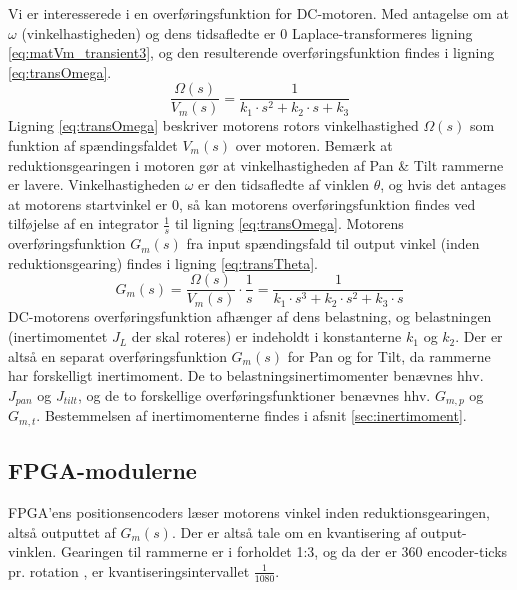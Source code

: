 Vi er interesserede i en overføringsfunktion for DC-motoren. Med antagelse om at \(\omega\) (vinkelhastigheden) og dens tidsafledte er 0
Laplace-transformeres ligning \ref{eq:matVm_transient3}, og den resulterende overføringsfunktion findes
i ligning \ref{eq:transOmega}.
\begin{equation}
	\frac{\Omega\left(s\right)}{V_m\left(s\right)}=\frac{1}{k_1\cdot{}s^2+k_2\cdot{}s+k_3}
	\label{eq:transOmega}
 \end{equation}
Ligning \ref{eq:transOmega} beskriver motorens rotors vinkelhastighed \(\Omega\left(s\right)\) som funktion af spændingsfaldet
\(V_m\left(s\right)\) over motoren. Bemærk at reduktionsgearingen i motoren gør at vinkelhastigheden af Pan \& Tilt rammerne
er lavere.
Vinkelhastigheden \(\omega\) er den tidsafledte af vinklen \(\theta\),
og hvis det antages at motorens startvinkel er 0, så kan motorens overføringsfunktion
findes ved tilføjelse af en integrator \(\frac{1}{s}\) til ligning \ref{eq:transOmega}.
Motorens overføringsfunktion \(G_m\left(s\right)\) fra input spændingsfald til output vinkel (inden reduktionsgearing) findes
i ligning \ref{eq:transTheta}.
\begin{equation}
	G_m\left(s\right)=\frac{\Omega\left(s\right)}{V_m\left(s\right)}\cdot{}\frac{1}{s}=\frac{1}{k_1\cdot{}s^3+k_2\cdot{}s^2+k_3\cdot{}s}
	\label{eq:transTheta}
\end{equation}
DC-motorens overføringsfunktion afhænger af dens belastning,
og belastningen (inertimomentet \(J_L\) der skal roteres) er indeholdt i konstanterne \(k_1\) og \(k_2\).
Der er altså en separat overføringsfunktion \(G_m\left(s\right)\) for Pan og for Tilt,
da rammerne har forskelligt inertimoment.
De to belastningsinertimomenter benævnes hhv. \(J_{pan}\) og \(J_{tilt}\),
og de to forskellige overføringsfunktioner benævnes hhv. \(G_{m,p}\) og \(G_{m,t}\).
Bestemmelsen af inertimomenterne findes i afsnit \ref{sec:inertimoment}.

\subsection{FPGA-modulerne}
\label{subsec:matFPGA}
FPGA'ens positionsencoders læser motorens vinkel inden reduktionsgearingen,
altså outputtet af \(G_m\left(s\right)\).
Der er altså tale om en kvantisering af output-vinklen.
Gearingen til rammerne er i forholdet 1:3, og da der er 360 encoder-ticks pr. rotation \citep{emgmotor},
er kvantiseringsintervallet \(\frac{1}{1080}\).


